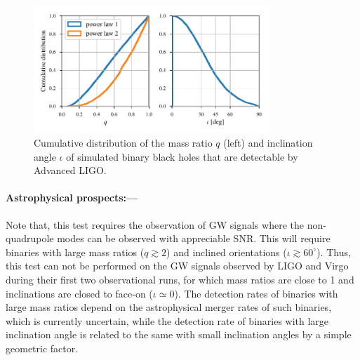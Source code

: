 \documentclass[prl,preprintnumbers,twocolumn,eqsecnum,floatfix,a4paper,nofootinbib,superscriptaddress]{revtex4}
\newcommand{\red}[1]{\textcolor{red}{#1}}
\begin{document}
% 


\begin{figure}[tbh]
	\includegraphics*[width=3.5in]{figs/q_and_iota_dist.pdf}
	\caption{Cumulative distribution of the mass ratio $q$ (left) and inclination angle $\iota$ of simulated binary black holes that are detectable by Advanced LIGO. }
	\label{fig:q_iota_distribution}
\end{figure}


\paragraph{Astrophysical prospects:---}  Note that, this test requires the observation of GW signals where the non-quadrupole modes can be observed with appreciable SNR. This will require binaries with large mass ratios ($q \gtrsim 2$) and inclined orientations ($\iota \gtrsim 60^{\circ}$). Thus, this test can not be performed on the GW signals observed by LIGO and Virgo during their first two observational runs, for which mass ratios are close to 1 and inclinations are closed to face-on ($\iota \simeq 0$). The detection rates of binaries with large mass ratios depend on the astrophysical merger rates of such binaries, which is currently uncertain, while the detection rate of binaries with large inclination angle is related to the same with small inclination angles by a simple geometric factor. 
\end{document}
